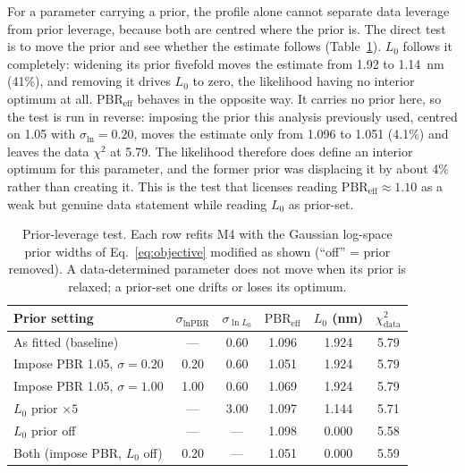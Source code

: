 \documentclass[preprint,12pt]{elsarticle}
\begin{document}
For a parameter carrying a prior, the profile alone cannot separate data
leverage from prior leverage, because both are centred where the prior
is. The direct test is to move the prior and see whether the estimate
follows (Table~\ref{tab:priortest}). $L_0$ follows it completely:
widening its prior fivefold moves the estimate from 1.92 to 1.14~nm
(41\%), and removing it drives $L_0$ to zero, the likelihood having no
interior optimum at all. $\mathrm{PBR}_\text{eff}$ behaves in the
opposite way. It carries no prior here, so the test is run in reverse:
imposing the prior this analysis previously used, centred on 1.05 with
$\sigma_{\ln} = 0.20$, moves the estimate only from 1.096 to 1.051
(4.1\%) and leaves the data $\chi^2$ at 5.79. The likelihood therefore
does define an interior optimum for this parameter, and the former prior
was displacing it by about 4\% rather than creating it. This is the test
that licenses reading $\mathrm{PBR}_\text{eff} \approx 1.10$ as a weak
but genuine data statement while reading $L_0$ as prior-set.

\begin{table}[htbp]
\centering
\caption{Prior-leverage test. Each row refits M4 with the Gaussian
log-space prior widths of Eq.~\eqref{eq:objective} modified as shown
(``off'' = prior removed). A data-determined parameter does not move when
its prior is relaxed; a prior-set one drifts or loses its optimum.}
\label{tab:priortest}
\small
\begin{tabular}{lccccc}
\toprule
Prior setting & $\sigma_{\ln \text{PBR}}$ & $\sigma_{\ln L_0}$ & $\mathrm{PBR}_\text{eff}$ & $L_0$ (nm) & $\chi^2_\text{data}$ \\
\midrule
As fitted (baseline) & --- & 0.60 & 1.096 & 1.924 & 5.79 \\
Impose PBR 1.05, $\sigma=0.20$ & 0.20 & 0.60 & 1.051 & 1.924 & 5.79 \\
Impose PBR 1.05, $\sigma=1.00$ & 1.00 & 0.60 & 1.069 & 1.924 & 5.79 \\
$L_0$ prior $\times5$ & --- & 3.00 & 1.097 & 1.144 & 5.71 \\
$L_0$ prior off & --- & --- & 1.098 & 0.000 & 5.58 \\
Both (impose PBR, $L_0$ off) & 0.20 & --- & 1.051 & 0.000 & 5.59 \\
\bottomrule
\end{tabular}
\end{table}
\end{document}
